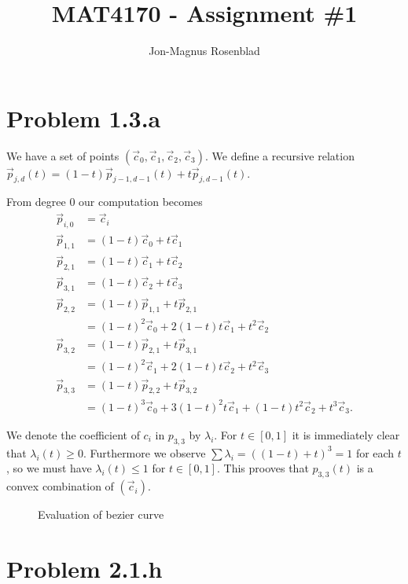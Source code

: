 \documentclass{article}
\author{Jon-Magnus Rosenblad}
\title{MAT4170 \-- Assignment \#1}
\begin{document}
\maketitle

\section*{Problem 1.3.a}

We have a set of points $(\vec c_0, \vec c_1, \vec c_2, \vec c_3)$.
We define a recursive relation 
$\vec p_{j,d}(t) = (1 - t) \vec p_{j - 1, d - 1}(t)
+ t \vec p_{j, d - 1}(t)$.

From degree $0$ our computation becomes
\begin{equation*}
\begin{aligned}
    \vec p_{i,0} &= \vec c_i\\
    \vec p_{1,1} &= (1 - t)\vec c_0 + t\vec c_1\\
    \vec p_{2,1} &= (1 - t)\vec c_1 + t\vec c_2\\
    \vec p_{3,1} &= (1 - t)\vec c_2 + t\vec c_3\\
    \vec p_{2,2} &= (1 - t)\vec p_{1,1} + t\vec p_{2,1}\\
    &= (1 - t)^2\vec c_0 + 2(1 - t)t\vec c_1 + t^2\vec c_2\\
    \vec p_{3,2} &= (1 - t)\vec p_{2,1} + t\vec p_{3,1}\\
    &= (1 - t)^2\vec c_1 + 2(1 - t)t\vec c_2 + t^2\vec c_3\\
    \vec p_{3,3} &= (1 - t)\vec p_{2,2} + t\vec p_{3,2}\\
    &= (1 - t)^3\vec c_0 + 3(1 - t)^2t \vec c_1
    + (1 - t)t^2\vec c_2 + t^3\vec c_3.
\end{aligned}
\end{equation*}

We denote the coefficient of $c_i$ in $p_{3,3}$ by $\lambda_i$.
For $t\in[0,1]$ it is immediately clear that $\lambda_i(t)\geq 0$.
Furthermore we observe $\sum\lambda_i = ((1 - t) + t)^3 = 1$ for each $t$,
so we must have $\lambda_i(t)\leq 1$ for $t\in [0,1]$.
This prooves that $p_{3,3}(t)$ is a convex combination of $(\vec c_i)$.

\begin{figure}
    \centering
    
    \caption{Evaluation of bezier curve}
\end{figure}




\section*{Problem 2.1.h}
\end{document}
